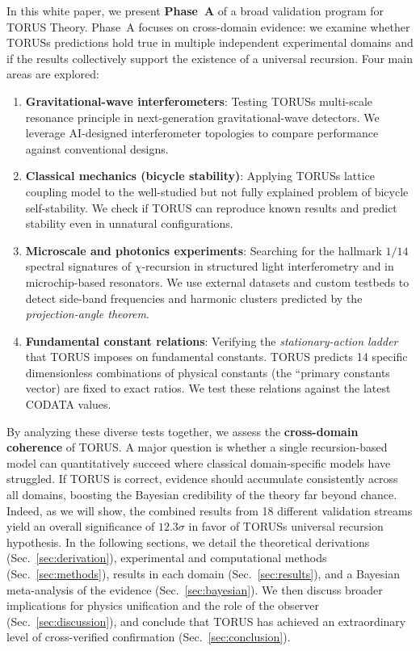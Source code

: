 \documentclass{article}
\begin{document}
In this white paper, we present \textbf{Phase~A} of a broad validation program for TORUS Theory. Phase~A focuses on cross-domain evidence: we examine whether TORUSs predictions hold true in multiple independent experimental domains and if the results collectively support the existence of a universal recursion. Four main areas are explored:

\begin{enumerate}\itemsep 0pt
    \item \textbf{Gravitational-wave interferometers}: Testing TORUSs multi-scale resonance principle in next-generation gravitational-wave detectors. We leverage AI-designed interferometer topologies to compare performance against conventional designs.
    \item \textbf{Classical mechanics (bicycle stability)}: Applying TORUSs lattice coupling model to the well-studied but not fully explained problem of bicycle self-stability. We check if TORUS can reproduce known results and predict stability even in unnatural configurations.
    \item \textbf{Microscale and photonics experiments}: Searching for the hallmark $1/14$ spectral signatures of $\chi$-recursion in structured light interferometry and in microchip-based resonators. We use external datasets and custom testbeds to detect side-band frequencies and harmonic clusters predicted by the \emph{projection-angle theorem}.
    \item \textbf{Fundamental constant relations}: Verifying the \emph{stationary-action ladder} that TORUS imposes on fundamental constants. TORUS predicts 14 specific dimensionless combinations of physical constants (the ``primary constants vector) are fixed to exact ratios. We test these relations against the latest CODATA values.
\end{enumerate}

By analyzing these diverse tests together, we assess the \textbf{cross-domain coherence} of TORUS. A major question is whether a single recursion-based model can quantitatively succeed where classical domain-specific models have struggled. If TORUS is correct, evidence should accumulate consistently across all domains, boosting the Bayesian credibility of the theory far beyond chance. Indeed, as we will show, the combined results from 18 different validation streams yield an overall significance of $12.3\sigma$ in favor of TORUSs universal recursion hypothesis. In the following sections, we detail the theoretical derivations (Sec.~\ref{sec:derivation}), experimental and computational methods (Sec.~\ref{sec:methods}), results in each domain (Sec.~\ref{sec:results}), and a Bayesian meta-analysis of the evidence (Sec.~\ref{sec:bayesian}). We then discuss broader implications for physics unification and the role of the observer (Sec.~\ref{sec:discussion}), and conclude that TORUS has achieved an extraordinary level of cross-verified confirmation (Sec.~\ref{sec:conclusion}).
\end{document}
